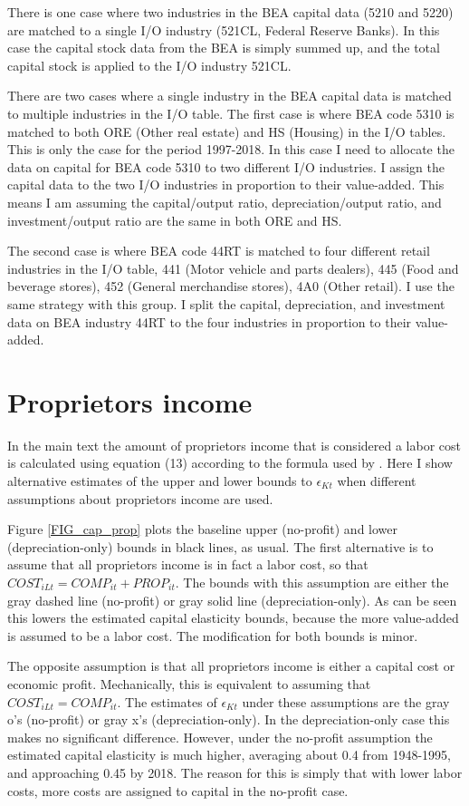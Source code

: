 \documentclass[11pt]{article}
\begin{document}
There is one case where two industries in the BEA capital data (5210 and 5220) are matched to a single I/O industry (521CL, Federal Reserve Banks). In this case the capital stock data from the BEA is simply summed up, and the total capital stock is applied to the I/O industry 521CL. 

There are two cases where a single industry in the BEA capital data is matched to multiple industries in the I/O table. The first case is where BEA code 5310 is matched to both ORE (Other real estate) and HS (Housing) in the I/O tables. This is only the case for the period 1997-2018. In this case I need to allocate the data on capital for BEA code 5310 to two different I/O industries. I assign the capital data to the two I/O industries in proportion to their value-added. This means I am assuming the capital/output ratio, depreciation/output ratio, and investment/output ratio are the same in both ORE and HS. 
	
The second case is where BEA code 44RT is matched to four different retail industries in the I/O table, 441 (Motor vehicle and parts dealers), 445 (Food and beverage stores), 452 (General merchandise stores), 4A0 (Other retail). I use the same strategy with this group. I split the capital, depreciation, and investment data on BEA industry 44RT to the four industries in proportion to their value-added.

\section{Proprietors income}
In the main text the amount of proprietors income that is considered a labor cost is calculated using equation (13) according to the formula used by \cite{gommerupert2004}. Here I show alternative estimates of the upper and lower bounds to $\epsilon_{Kt}$ when different assumptions about proprietors income are used. 

Figure \ref{FIG_cap_prop} plots the baseline upper (no-profit) and lower (depreciation-only) bounds in black lines, as usual. The first alternative is to assume that all proprietors income is in fact a labor cost, so that $COST_{iLt} = COMP_{it} + PROP_{it}$. The bounds with this assumption are either the gray dashed line (no-profit) or gray solid line (depreciation-only). As can be seen this lowers the estimated capital elasticity bounds, because the more value-added is assumed to be a labor cost. The modification for both bounds is minor.

The opposite assumption is that all proprietors income is either a capital cost or economic profit. Mechanically, this is equivalent to assuming that $COST_{iLt} = COMP_{it}$. The estimates of $\epsilon_{Kt}$ under these assumptions are the gray o's (no-profit) or gray x's (depreciation-only). In the depreciation-only case this makes no significant difference. However, under the no-profit assumption the estimated capital elasticity is much higher, averaging about 0.4 from 1948-1995, and approaching 0.45 by 2018. The reason for this is simply that with lower labor costs, more costs are assigned to capital in the no-profit case. 
\end{document}
